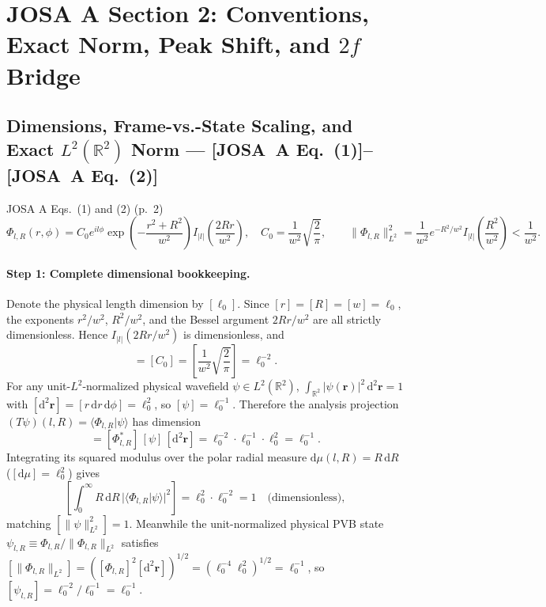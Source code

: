 \documentclass[10pt,letterpaper]{article}
\newcommand{\braket}[2]{\langle #1 | #2 \rangle}
\newcommand{\norm}[1]{\lVert #1 \rVert}
\newcommand{\abs}[1]{\lvert #1 \rvert}
\newcommand{\dd}{\mathrm{d}}
\newcommand{\josa}[1]{\textbf{[JOSA~A Eq.~(#1)]}}
\numberwithin{equation}{section}
\begin{document}
\section{JOSA A Section 2: Conventions, Exact Norm, Peak Shift, and $2f$ Bridge}
\label{sec:s2}

\subsection{Dimensions, Frame-vs.-State Scaling, and Exact $L^2(\mathbb{R}^2)$ Norm --- \josa{1}--\josa{2}}
\label{sec:s2_norm}

\begin{targeteq}{JOSA A Eqs.~(1) and (2) (p.~2)}
\[
  \Phi_{l,R}(r,\phi) = C_0 e^{il\phi}\exp\!\left(-\frac{r^2+R^2}{w^2}\right) I_{\abs{l}}\!\left(\frac{2Rr}{w^2}\right), \quad C_0 = \frac{1}{w^2}\sqrt{\frac{2}{\pi}}, \qquad
  \norm{\Phi_{l,R}}_{L^2}^2 = \frac{1}{w^2} e^{-R^2/w^2} I_{\abs{l}}\!\left(\frac{R^2}{w^2}\right) < \frac{1}{w^2}.
\]
\end{targeteq}

\paragraph*{Step 1: Complete dimensional bookkeeping.}
Denote the physical length dimension by $[\ell_0]$. Since $[r] = [R] = [w] = \ell_0$, the exponents $r^2/w^2$, $R^2/w^2$, and the Bessel argument $2Rr/w^2$ are all strictly dimensionless. Hence $I_{\abs{l}}(2Rr/w^2)$ is dimensionless, and
\begin{equation}
  [\Phi_{l,R}] = [C_0] = \left[\frac{1}{w^2}\sqrt{\frac{2}{\pi}}\right] = \ell_0^{-2}.
\end{equation}
For any unit-$L^2$-normalized physical wavefield $\psi \in L^2(\mathbb{R}^2)$, $\int_{\mathbb{R}^2}\abs{\psi(\mathbf{r})}^2\,\dd^2\mathbf{r} = 1$ with $[\dd^2\mathbf{r}] = [r\,\dd r\,\dd\phi] = \ell_0^2$, so $[\psi] = \ell_0^{-1}$. Therefore the analysis projection $(T\psi)(l,R) = \braket{\Phi_{l,R}}{\psi}$ has dimension
\begin{equation}
  [(T\psi)(l,R)] = [\Phi_{l,R}^*]\,[\psi]\,[\dd^2\mathbf{r}] = \ell_0^{-2}\cdot\ell_0^{-1}\cdot\ell_0^2 = \ell_0^{-1}.
\end{equation}
Integrating its squared modulus over the polar radial measure $\dd\mu(l,R) = R\,\dd R$ ($[\dd\mu] = \ell_0^2$) gives
\begin{equation}
  \left[\int_0^\infty R\,\dd R\,\abs{\braket{\Phi_{l,R}}{\psi}}^2\right] = \ell_0^2\cdot\ell_0^{-2} = 1\quad\text{(dimensionless)},
\end{equation}
matching $[\norm{\psi}_{L^2}^2] = 1$. Meanwhile the unit-normalized physical PVB state $\psi_{l,R} \equiv \Phi_{l,R}/\norm{\Phi_{l,R}}_{L^2}$ satisfies $[\norm{\Phi_{l,R}}_{L^2}] = ([\Phi_{l,R}]^2[\dd^2\mathbf{r}])^{1/2} = (\ell_0^{-4}\ell_0^2)^{1/2} = \ell_0^{-1}$, so $[\psi_{l,R}] = \ell_0^{-2}/\ell_0^{-1} = \ell_0^{-1}$.
\end{document}

